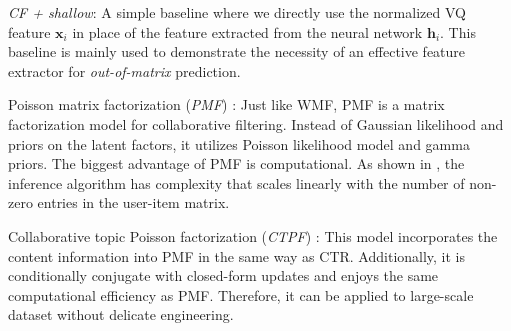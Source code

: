  \emph{CF + shallow}: A simple baseline where we directly use the normalized VQ feature $\boldsymbol{x}_i$ in place of the feature extracted from the neural network $\boldsymbol{h}_i$. This baseline is mainly used to demonstrate the necessity of an effective feature extractor for \emph{out-of-matrix} prediction. 

Poisson matrix factorization (\emph{PMF}) \cite{gopalan2013scalable}: Just like WMF, PMF is a matrix factorization model for collaborative filtering. Instead of Gaussian likelihood and priors on the latent factors, it utilizes Poisson likelihood model and gamma priors.
The biggest advantage of PMF is computational. As shown in \cite{gopalan2013scalable}, the inference algorithm has complexity that scales linearly with the number of non-zero entries in the user-item matrix. 

Collaborative topic Poisson factorization (\emph{CTPF}) \cite{gopalan2014content}: This model incorporates the content information into PMF in the same way as CTR. 
Additionally, it is conditionally conjugate with closed-form updates and enjoys the same computational efficiency as PMF. Therefore, it can be applied to large-scale dataset without delicate engineering.

